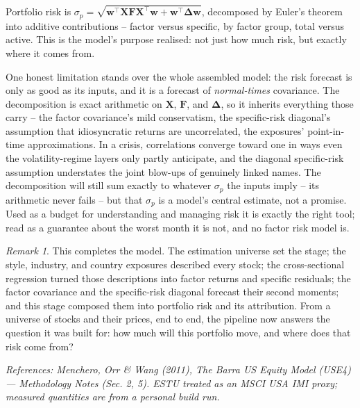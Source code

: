 \documentclass[11pt]{article}
\theoremstyle{definition}
\theoremstyle{plain}
\theoremstyle{remark}
\newtheorem*{remark}{Remark}
\newcommand{\T}{^{\!\top}}
\newcommand{\wvec}{\mathbf{w}}
\newcommand{\Xmat}{\mathbf{X}}
\newcommand{\Fmat}{\mathbf{F}}
\newcommand{\Del}{\boldsymbol{\Delta}}
\begin{document}
\begin{keyresult}
Portfolio risk is $\sigma_p=\sqrt{\wvec\T\Xmat\Fmat\Xmat\T\wvec+\wvec\T\Del\wvec}$, decomposed by Euler's theorem into additive contributions -- factor versus specific, by factor group, total versus active. This is the model's purpose realised: not just how much risk, but exactly where it comes from.
\end{keyresult}

\begin{pitfall}
One honest limitation stands over the whole assembled model: the risk forecast is only as good as its inputs, and it is a forecast of \emph{normal-times} covariance. The decomposition is exact arithmetic on $\Xmat$, $\Fmat$, and $\Del$, so it inherits everything those carry -- the factor covariance's mild conservatism, the specific-risk diagonal's assumption that idiosyncratic returns are uncorrelated, the exposures' point-in-time approximations. In a crisis, correlations converge toward one in ways even the volatility-regime layers only partly anticipate, and the diagonal specific-risk assumption understates the joint blow-ups of genuinely linked names. The decomposition will still sum exactly to whatever $\sigma_p$ the inputs imply -- its arithmetic never fails -- but that $\sigma_p$ is a model's central estimate, not a promise. Used as a budget for understanding and managing risk it is exactly the right tool; read as a guarantee about the worst month it is not, and no factor risk model is.
\end{pitfall}

\begin{remark}
This completes the model. The estimation universe set the stage; the style, industry, and country exposures described every stock; the cross-sectional regression turned those descriptions into factor returns and specific residuals; the factor covariance and the specific-risk diagonal forecast their second moments; and this stage composed them into portfolio risk and its attribution. From a universe of stocks and their prices, end to end, the pipeline now answers the question it was built for: how much will this portfolio move, and where does that risk come from?
\end{remark}

\begin{center}\small\itshape
References: Menchero, Orr \& Wang (2011), \textit{The Barra US Equity Model (USE4)} --- Methodology Notes (Sec. 2, 5). ESTU treated as an MSCI USA IMI proxy; measured quantities are from a personal build run.
\end{center}
\end{document}
